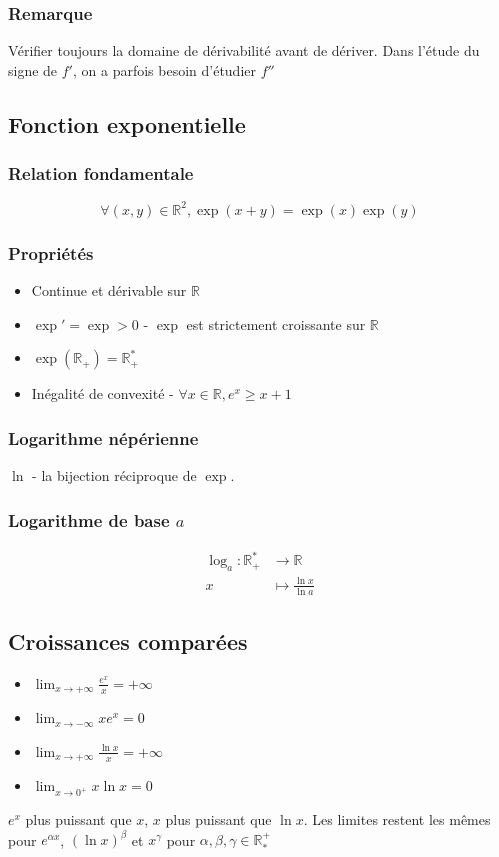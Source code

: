 \documentclass[openany]{book}
\begin{document}
\subsubsection{Remarque}
Vérifier toujours la domaine de dérivabilité avant de dériver. Dans l'étude du signe de $f'$, on a parfois besoin d'étudier $f''$

\subsection{Fonction exponentielle}
\subsubsection{Relation fondamentale}
\[ \forall (x, y) \in \mathbb{R}^2, \exp(x+y) = \exp(x)\exp(y) \]

\subsubsection{Propriétés}
\begin{itemize}
    \item Continue et dérivable sur $\mathbb{R}$
    \item $ \exp' = \exp >0 $ - $ \exp $ est strictement croissante sur $\mathbb{R}$
    \item $ \exp(\mathbb{R}_+) = \mathbb{R}_+^* $
    \item Inégalité de convexité - $ \forall x \in \mathbb{R}, e^x \geq x+1 $
\end{itemize}

\subsubsection{Logarithme népérienne}
$ \ln $ - la bijection réciproque de $ \exp $.

\subsubsection{Logarithme de base $a$}
\begin{align*}
    \log_a :  \mathbb{R}_+^* &\to \mathbb{R} \\
     x &\mapsto \frac{\ln{x}}{\ln{a}}
\end{align*}

\subsection{Croissances comparées}
\begin{itemize}
    \item $ \lim_{x\to +\infty} \frac{e^x}{x} = + \infty $
    \item $ \lim_{x\to -\infty} xe^x = 0 $
    \item $ \lim_{x\to +\infty} \frac{\ln{x}}{x} = + \infty $
    \item $ \lim_{x\to 0^+} x\ln{x} = 0 $
\end{itemize}
$e^x$ plus puissant que $x$, $x$ plus puissant que $\ln x$. Les limites restent les mêmes pour $e^{\alpha x}$, $(\ln x)^\beta$ et $x^\gamma$ pour $\alpha , \beta , \gamma \in \mathbb{R}^+_*$
\end{document}
